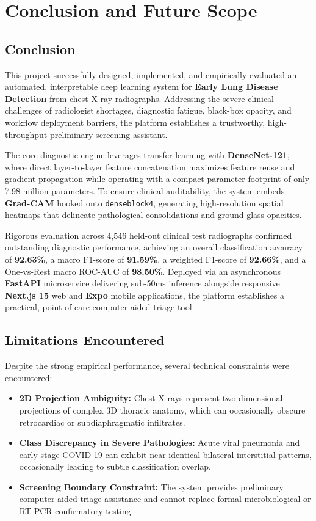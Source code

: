 \documentclass[12pt,a4paper]{report}
\begin{document}
\chapter{Conclusion and Future Scope}

\section{Conclusion}
This project successfully designed, implemented, and empirically evaluated an automated, interpretable deep learning system for \textbf{Early Lung Disease Detection} from chest X-ray radiographs. Addressing the severe clinical challenges of radiologist shortages, diagnostic fatigue, black-box opacity, and workflow deployment barriers, the platform establishes a trustworthy, high-throughput preliminary screening assistant.

The core diagnostic engine leverages transfer learning with \textbf{DenseNet-121}, where direct layer-to-layer feature concatenation maximizes feature reuse and gradient propagation while operating with a compact parameter footprint of only 7.98 million parameters. To ensure clinical auditability, the system embeds \textbf{Grad-CAM} hooked onto \texttt{denseblock4}, generating high-resolution spatial heatmaps that delineate pathological consolidations and ground-glass opacities.

Rigorous evaluation across 4,546 held-out clinical test radiographs confirmed outstanding diagnostic performance, achieving an overall classification accuracy of \textbf{92.63\%}, a macro F1-score of \textbf{91.59\%}, a weighted F1-score of \textbf{92.66\%}, and a One-vs-Rest macro ROC-AUC of \textbf{98.50\%}. Deployed via an asynchronous \textbf{FastAPI} microservice delivering sub-50ms inference alongside responsive \textbf{Next.js 15} web and \textbf{Expo} mobile applications, the platform establishes a practical, point-of-care computer-aided triage tool.

\section{Limitations Encountered}
Despite the strong empirical performance, several technical constraints were encountered:
\begin{itemize}
    \item \textbf{2D Projection Ambiguity:} Chest X-rays represent two-dimensional projections of complex 3D thoracic anatomy, which can occasionally obscure retrocardiac or subdiaphragmatic infiltrates.
    \item \textbf{Class Discrepancy in Severe Pathologies:} Acute viral pneumonia and early-stage COVID-19 can exhibit near-identical bilateral interstitial patterns, occasionally leading to subtle classification overlap.
    \item \textbf{Screening Boundary Constraint:} The system provides preliminary computer-aided triage assistance and cannot replace formal microbiological or RT-PCR confirmatory testing.
\end{itemize}
\end{document}
